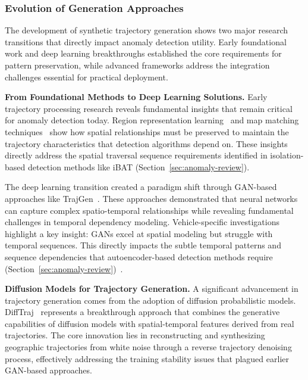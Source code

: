 \subsubsection{Evolution of Generation Approaches}

The development of synthetic trajectory generation shows two major research transitions that directly impact anomaly detection utility. Early foundational work and deep learning breakthroughs established the core requirements for pattern preservation, while advanced frameworks address the integration challenges essential for practical deployment.

\textbf{From Foundational Methods to Deep Learning Solutions.} Early trajectory processing research reveals fundamental insights that remain critical for anomaly detection today. Region representation learning~\cite{wangRegionRepresentationLearning2017} and map matching techniques~\cite{newsonHiddenMarkovMap2009} show how spatial relationships must be preserved to maintain the trajectory characteristics that detection algorithms depend on. These insights directly address the spatial traversal sequence requirements identified in isolation-based detection methods like iBAT (Section~\ref{sec:anomaly-review}).

The deep learning transition created a paradigm shift through GAN-based approaches like TrajGen~\cite{caoGeneratingMobilityTrajectories2021}. These approaches demonstrated that neural networks can capture complex spatio-temporal relationships while revealing fundamental challenges in temporal dependency modeling. Vehicle-specific investigations~\cite{bajarunasGenerativeAdversarialNetworks2022} highlight a key insight: GANs excel at spatial modeling but struggle with temporal sequences. This directly impacts the subtle temporal patterns and sequence dependencies that autoencoder-based detection methods require (Section~\ref{sec:anomaly-review})~\cite{huangLSTMAutoencodersAttention2021}.

\textbf{Diffusion Models for Trajectory Generation.} A significant advancement in trajectory generation comes from the adoption of diffusion probabilistic models. DiffTraj~\cite{zhuDiffTrajGeneratingGPS2023} represents a breakthrough approach that combines the generative capabilities of diffusion models with spatial-temporal features derived from real trajectories. The core innovation lies in reconstructing and synthesizing geographic trajectories from white noise through a reverse trajectory denoising process, effectively addressing the training stability issues that plagued earlier GAN-based approaches.

